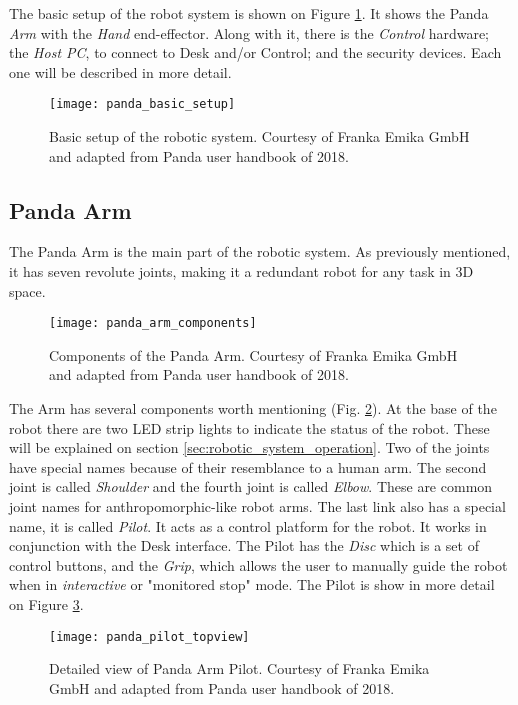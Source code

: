 The basic setup of the robot system is shown on Figure \ref{fig:robotic_system_basic_setup}. It shows the Panda \emph{Arm} with the \emph{Hand} end-effector. Along with it, there is the \emph{Control} hardware; the \emph{Host PC}, to connect to Desk and/or Control; and the security devices. Each one will be described in more detail.

\begin{figure}[htbp]
	\centering
	\texttt{[image: panda\_basic\_setup]}
	\caption{Basic setup of the robotic system. Courtesy of Franka Emika GmbH and adapted from Panda user handbook of 2018.}
	\label{fig:robotic_system_basic_setup}
\end{figure}

\subsection*{Panda Arm}
\label{subsec:robotic_system_physical_description_panda_arm}

The Panda Arm is the main part of the robotic system. As previously mentioned, it has seven revolute joints, making it a redundant robot for any task in 3D space.

\begin{figure}[htbp]
	\centering
	\texttt{[image: panda\_arm\_components]}
	\caption{Components of the Panda Arm. Courtesy of Franka Emika GmbH and adapted from Panda user handbook of 2018.}
	\label{fig:panda_arm_components}
\end{figure}

The Arm has several components worth mentioning (Fig. \ref{fig:panda_arm_components}). At the base of the robot there are two LED strip lights to indicate the status of the robot. These will be explained on section \ref{sec:robotic_system_operation}. Two of the joints have special names because of their resemblance to a human arm. The second joint is called \emph{Shoulder} and the fourth joint is called \emph{Elbow}. These are common joint names for anthropomorphic-like robot arms. The last link also has a special name, it is called \emph{Pilot}. It acts as a control platform for the robot. It works in conjunction with the Desk interface. The Pilot has the \emph{Disc} which is a set of control buttons, and the \emph{Grip}, which allows the user to manually guide the robot when in \emph{interactive} or "monitored stop" mode. The Pilot is show in more detail on Figure \ref{fig:panda_pilot_topview}.

\begin{figure}[htbp]
    \centering
	\texttt{[image: panda\_pilot\_topview]}
	\caption{Detailed view of Panda Arm Pilot. Courtesy of Franka Emika GmbH and adapted from Panda user handbook of 2018.}
	\label{fig:panda_pilot_topview}
\end{figure}

